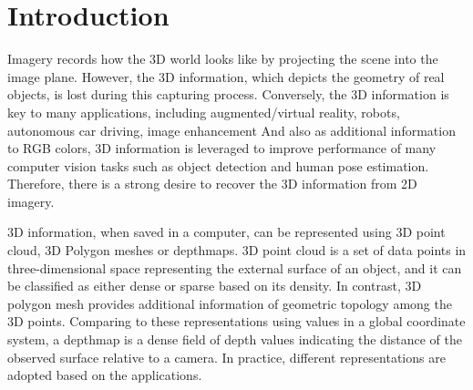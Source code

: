 \chapter{Introduction}


Imagery records how the 3D world looks like by projecting the scene into the image plane. 
However, the 3D information, which depicts the geometry of real objects, is lost during this capturing process. Conversely, the 3D information is key to many applications, including augmented/virtual reality, robots, autonomous car driving, image enhancement \etc 
And also as additional information to RGB colors, 3D information is leveraged to improve performance of many computer vision tasks such as object detection and human pose estimation. Therefore, there is a strong desire to recover the 3D information from 2D imagery.

3D information, when saved in a computer, can be represented using 3D point cloud, 3D Polygon meshes or depthmaps. 3D point cloud is a set of data points in three-dimensional space representing the external surface of an object, and it can be classified as either dense or sparse based on its density. In contrast, 3D polygon mesh provides additional information of geometric topology among the 3D points. Comparing to these representations using values in a global coordinate system, a depthmap is a dense field of depth values indicating the distance of the observed surface relative to a camera. In practice, different representations are adopted based on the applications. 

